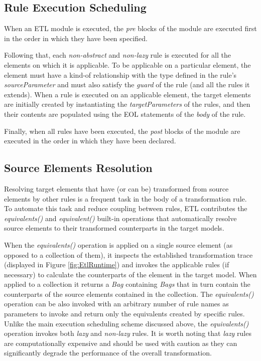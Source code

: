 \subsection{Rule Execution Scheduling}

When an ETL module is executed, the \emph{pre} blocks of the module are executed first in the order in which they have been specified. 

Following that, each \emph{non-abstract} and \emph{non-lazy} rule is executed for all the elements on which it is applicable. To be applicable on a particular element, the element must have a kind-of relationship with the type defined in the rule's \emph{sourceParameter} and must also satisfy the \emph{guard} of the rule (and all the rules it extends). When a rule is executed on an applicable element, the target elements are initially created by instantiating the \emph{targetParameters} of the rules, and then their contents are populated using the EOL statements of the \emph{body} of the rule.

Finally, when all rules have been executed, the \emph{post} blocks of the module are executed in the order in which they have been declared.

\subsection{Source Elements Resolution}

Resolving target elements that have (or can be) transformed from source elements by other rules is a frequent task in the body of a transformation rule. To automate this task and reduce coupling between rules, ETL contributes the \emph{equivalents()} and \emph{equivalent()} built-in operations that automatically resolve source elements to their transformed counterparts in the target models. 

When the \emph{equivalents()} operation is applied on a single source element (as opposed to a collection of them), it inspects the established transformation trace (displayed in Figure \ref{fig:EtlRuntime}) and invokes the applicable rules (if necessary) to calculate the counterparts of the element in the target model. When applied to a collection it returns a \emph{Bag} containing \emph{Bags} that in turn contain the counterparts of the source elements contained in the collection. The \emph{equivalents()} operation can be also invoked with an arbitrary number of rule names as parameters to invoke and return only the equivalents created by specific rules. Unlike the main execution scheduling scheme discussed above, the \emph{equivalents()} operation invokes both \emph{lazy} and \emph{non-lazy} rules. It is worth noting that \emph{lazy} rules are computationally expensive and should be used with caution as they can significantly degrade the performance of the overall transformation.

